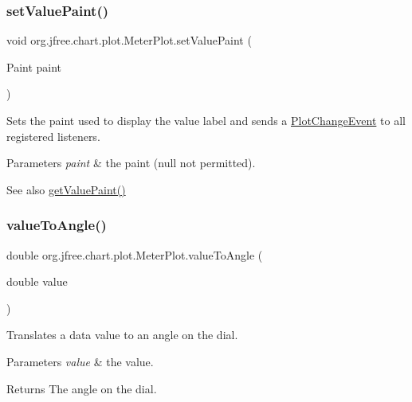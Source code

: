 \subsubsection{\texorpdfstring{set\+Value\+Paint()}{setValuePaint()}}
{\footnotesize\ttfamily void org.\+jfree.\+chart.\+plot.\+Meter\+Plot.\+set\+Value\+Paint (\begin{DoxyParamCaption}\item[{Paint}]{paint }\end{DoxyParamCaption})}

Sets the paint used to display the value label and sends a \mbox{\hyperlink{}{Plot\+Change\+Event}} to all registered listeners.


\begin{DoxyParams}{Parameters}
{\em paint} & the paint ({\ttfamily null} not permitted).\\
\hline
\end{DoxyParams}
\begin{DoxySeeAlso}{See also}
\mbox{\hyperlink{classorg_1_1jfree_1_1chart_1_1plot_1_1_meter_plot_aedb95f7f25ba6d7083dfeb8c1786d626}{get\+Value\+Paint()}} 
\end{DoxySeeAlso}
\mbox{\label{classorg_1_1jfree_1_1chart_1_1plot_1_1_meter_plot_a3712238c445e76aa2270674abd819e3d}} 
\subsubsection{\texorpdfstring{value\+To\+Angle()}{valueToAngle()}}
{\footnotesize\ttfamily double org.\+jfree.\+chart.\+plot.\+Meter\+Plot.\+value\+To\+Angle (\begin{DoxyParamCaption}\item[{double}]{value }\end{DoxyParamCaption})}

Translates a data value to an angle on the dial.


\begin{DoxyParams}{Parameters}
{\em value} & the value.\\
\hline
\end{DoxyParams}
\begin{DoxyReturn}{Returns}
The angle on the dial. 
\end{DoxyReturn}
\mbox{\label{classorg_1_1jfree_1_1chart_1_1plot_1_1_meter_plot_a656e96cf8e085d8b6226866abc942343}} 
